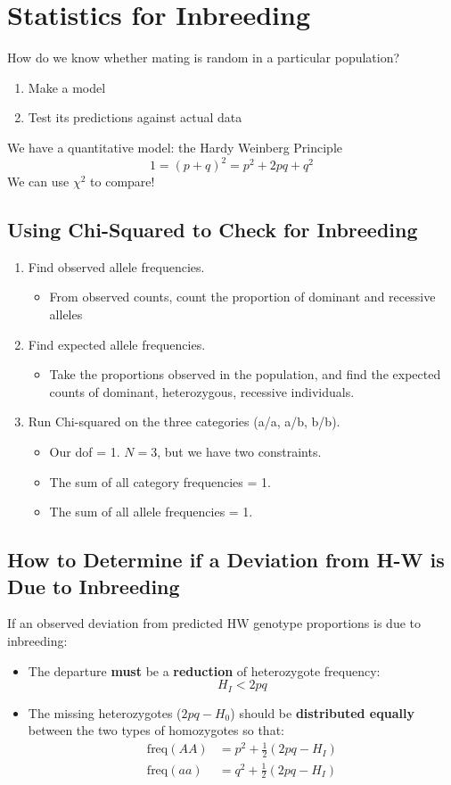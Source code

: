 \documentclass[10pt]{article}
\begin{document}
\section*{Statistics for Inbreeding}
How do we know whether mating is random in a particular population?
\begin{enumerate}
	\item Make a model
	\item Test its predictions against actual data
\end{enumerate}
We have a quantitative model: the Hardy Weinberg Principle
\[1 = (p + q)^2 = p^2 + 2pq + q^2\]
We can use $\chi^2$ to compare!

\subsection*{Using Chi-Squared to Check for Inbreeding}
\begin{enumerate}
	\item Find observed allele frequencies.
	\begin{itemize}
	    \item From observed counts, count the proportion of dominant and recessive alleles
    \end{itemize}
	\item Find expected allele frequencies.
	\begin{itemize}
	    \item Take the proportions observed in the population, and find the expected counts of dominant, heterozygous, recessive individuals.
    \end{itemize}
	\item Run Chi-squared on the three categories (a/a, a/b, b/b). 
	\begin{itemize}
	    \item Our dof = 1.  $N = 3$, but we have two constraints.
	    \item The sum of all category frequencies = 1.
	    \item The sum of all allele frequencies = 1. 
    \end{itemize}
\end{enumerate}

\subsection*{How to Determine if a Deviation from H-W is Due to Inbreeding}
If an observed deviation from predicted HW genotype proportions is due to inbreeding: 
\begin{itemize}
	\item The departure \textbf{must} be a \textbf{reduction} of heterozygote frequency:
	\[H_I < 2pq\]
    \item The missing heterozygotes ($2pq - H_0$) should be \textbf{distributed equally} between the two types of homozygotes so that:
    \begin{align*}
        \text{freq}(AA) &= p^2 + \frac{1}{2} (2pq - H_I) \\
        \text{freq}(aa) &= q^2 + \frac{1}{2} (2pq - H_I)
    \end{align*}
\end{itemize}
\end{document}
